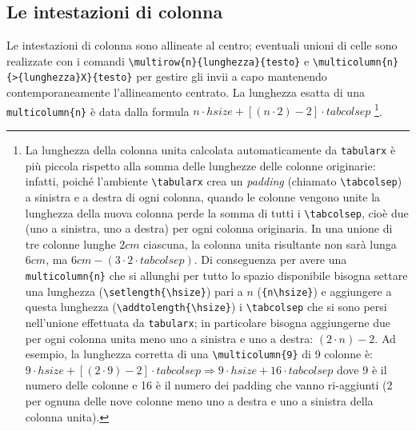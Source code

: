 \documentclass[a4paper, 12pt]{article}\usepackage[]{graphicx}\usepackage[]{color}
\begin{document}
\subsection{Le intestazioni di colonna} 
\label{sec:intestazioni}
Le intestazioni di colonna sono allineate al centro; eventuali unioni di celle sono realizzate con i comandi \verb|\multirow{n}{lunghezza}{testo}| e  \verb|\multicolumn{n}{>{lunghezza}X}{testo}| per gestire gli invii a capo mantenendo contemporaneamente l'allineamento centrato. La lunghezza esatta di una \verb|multicolumn{n}| è data dalla formula $n \cdot hsize + [(n \cdot 2)-2] \cdot tabcolsep$
\footnote{La lunghezza della colonna unita calcolata automaticamente da \verb|tabularx| è più piccola rispetto alla somma delle lunghezze delle colonne originarie: infatti, poiché l'ambiente \verb|\tabularx| crea un \emph{padding} (chiamato \verb|\tabcolsep|) a sinistra e a destra di ogni colonna, quando le colonne vengono unite la lunghezza della nuova colonna perde la somma di tutti i \verb|\tabcolsep|, cioè due (uno a sinistra, uno a destra) per ogni colonna originaria. In una unione di tre colonne lunghe $2cm$ ciascuna, la colonna unita risultante non sarà lunga $6cm$, ma $6cm-(3 \cdot 2 \cdot tabcolsep)$. Di conseguenza per avere una \verb|multicolumn{n}| che si allunghi per tutto lo spazio disponibile bisogna settare una lunghezza (\verb|\setlength{\hsize}|) pari a $n$ (\verb|{n\hsize}|) e aggiungere a questa lunghezza (\verb|\addtolength{\hsize}|) i \verb|\tabcolsep| che si sono persi nell'unione effettuata da \verb|tabularx|; in particolare bisogna aggiungerne due per ogni colonna unita meno uno a sinistra e uno a destra: $(2 \cdot n)-2$. Ad esempio, la lunghezza corretta di una \verb|\multicolumn{9}| di 9 colonne è: $9 \cdot hsize + [(2 \cdot 9)-2] \cdot tabcolsep \Rightarrow 9 \cdot hsize + 16 \cdot tabcolsep$ dove 9 è il numero delle colonne e 16 è il numero dei padding che vanno ri-aggiunti (2 per ognuna delle nove colonne meno uno a destra e uno a sinistra della colonna unita).}.
\end{document}
